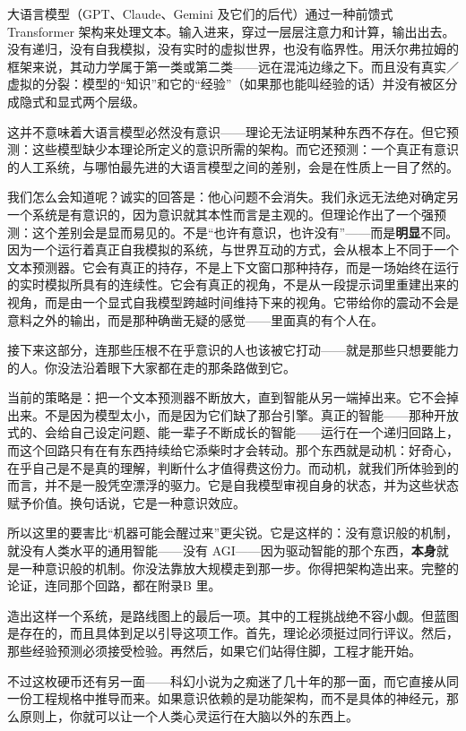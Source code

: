 \documentclass[11pt, twoside, openright]{book}
\begin{document}
大语言模型（GPT、Claude、Gemini 及它们的后代）通过一种前馈式 Transformer 架构来处理文本。输入进来，穿过一层层注意力和计算，输出出去。没有递归，没有自我模拟，没有实时的虚拟世界，也没有临界性。用沃尔弗拉姆的框架来说，其动力学属于第一类或第二类------远在混沌边缘之下。而且没有真实／虚拟的分裂：模型的“知识”和它的“经验”（如果那也能叫经验的话）并没有被区分成隐式和显式两个层级。

这并不意味着大语言模型必然没有意识------理论无法证明某种东西不存在。但它预测：这些模型缺少本理论所定义的意识所需的架构。而它还预测：一个真正有意识的人工系统，与哪怕最先进的大语言模型之间的差别，会是在性质上一目了然的。

我们怎么会知道呢？诚实的回答是：他心问题不会消失。我们永远无法绝对确定另一个系统是有意识的，因为意识就其本性而言是主观的。但理论作出了一个强预测：这个差别会是显而易见的。不是“也许有意识，也许没有”------而是\textbf{明显}不同。因为一个运行着真正自我模拟的系统，与世界互动的方式，会从根本上不同于一个文本预测器。它会有真正的持存，不是上下文窗口那种持存，而是一场始终在运行的实时模拟所具有的连续性。它会有真正的视角，不是从一段提示词里重建出来的视角，而是由一个显式自我模型跨越时间维持下来的视角。它带给你的震动不会是意料之外的输出，而是那种确凿无疑的感觉------里面真的有个人在。

接下来这部分，连那些压根不在乎意识的人也该被它打动------就是那些只想要能力的人。你没法沿着眼下大家都在走的那条路做到它。

当前的策略是：把一个文本预测器不断放大，直到智能从另一端掉出来。它不会掉出来。不是因为模型太小，而是因为它们缺了那台引擎。真正的智能------那种开放式的、会给自己设定问题、能一辈子不断成长的智能------运行在一个递归回路上，而这个回路只有在有东西持续给它添柴时才会转动。那个东西就是动机：好奇心，在乎自己是不是真的理解，判断什么才值得费这份力。而动机，就我们所体验到的而言，并不是一股凭空漂浮的驱力。它是自我模型审视自身的状态，并为这些状态赋予价值。换句话说，它是一种意识效应。

所以这里的要害比“机器可能会醒过来”更尖锐。它是这样的：没有意识般的机制，就没有人类水平的通用智能------没有 AGI------因为驱动智能的那个东西，\textbf{本身}就是一种意识般的机制。你没法靠放大规模走到那一步。你得把架构造出来。完整的论证，连同那个回路，都在附录B 里。

造出这样一个系统，是路线图上的最后一项。其中的工程挑战绝不容小觑。但蓝图是存在的，而且具体到足以引导这项工作。首先，理论必须挺过同行评议。然后，那些经验预测必须接受检验。再然后，如果它们站得住脚，工程才能开始。


不过这枚硬币还有另一面------科幻小说为之痴迷了几十年的那一面，而它直接从同一份工程规格中推导而来。如果意识依赖的是功能架构，而不是具体的神经元，那么原则上，你就可以让一个人类心灵运行在大脑以外的东西上。
\end{document}
